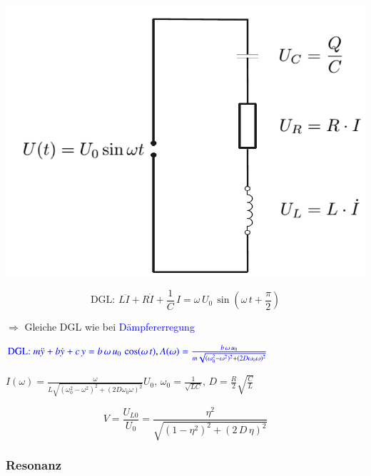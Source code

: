 \begin{minipage}{0.3\linewidth}
\includegraphics[width=\linewidth]{Bilder/Wellen-Optik/schwingkreis}  \\
\end{minipage}
\hfill
\begin{minipage}{0.68\linewidth}
$$ \boxed{ \text{DGL: } L \ddot{I} + R \dot{I} + \frac{1}{C} \, I = \omega \, U_0 \,\sin(\omega \, t + \frac{\pi}{2}) } $$

$\Rightarrow$ Gleiche DGL wie bei \textcolor{blue}{Dämpfererregung} \\
\end{minipage}


$ \textcolor{blue}{\text{DGL: } m \ddot{y} + b \dot{y} + c \, y = b \, \omega \, u_0 \, \cos(\omega \, t) }, \textcolor{blue}{A(\omega) =  \frac{b \, \omega \, u_0}{m\sqrt{(\omega_0^2 -\omega^2)^2 + (2D \omega_0 \omega)^2}} } $ \\

\vspace{0.1cm}


$ \boxed{ I(\omega) =  \frac{\omega}{L\sqrt{(\omega_0^2 -\omega^2)^2 + (2D \omega_0 \omega)^2}}U_0, \, \omega_0 = \frac{1}{\sqrt{LC}} , \, D = \frac{R}{2}\sqrt{\frac{C}{L}}} $ 

\vspace{0.1cm}

$$ \boxed{ V = \frac{U_{L0}}{U_0} = \frac{\eta^2}{\sqrt{(1 - \eta^2)^2 + (2 \, D \, \eta)^2}} }$$



\subsubsection{Resonanz}

